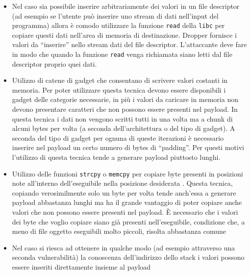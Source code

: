 \begin{itemize}

\item Nel caso sia possibile inserire arbitrariamente dei valori in un
  file descriptor (ad esempio se l'utente può inserire uno stream di
  dati nell'input del programma) allora è comodo utilizzare la
  funzione \lstinline{read} della \lstinline{libc} per copiare questi
  dati nell'area di memoria di destinazione. Dropper fornisce i valori
  da ``inserire'' nello stream dati del file descriptor. L'attaccante
  deve fare in modo che quando la funzione \lstinline{read} venga
  richiamata siano letti dal file descriptor proprio quei dati.

\item Utilizzo di catene di gadget che consentano di scrivere valori
  costanti in memoria. Per poter utilizzare questa tecnica devono
  essere disponibili i gadget delle categorie necessarie, in più i
  valori da caricare in memoria non devono presentare caratteri che
  non possono essere presenti nel payload. In questa tecnica i dati
  non vengono scritti tutti in una volta ma a chunk di alcuni bytes
  per volta (a seconda dell'architettura o del tipo di gadget). A
  seconda del tipo di gadget per ognuna di queste iterazioni è
  necessario inserire nel payload un certo numero di bytes di
  ``padding''. Per questi motivi l'utilizzo di questa tecnica tende a
  generare payload piuttosto lunghi.

\item Utilizzo delle funzioni \lstinline{strcpy} o \lstinline{memcpy}
  per copiare byte presenti in posizioni note all'interno
  dell'eseguibile nella posizione desiderata \cite{longld:2010}.
  Questa tecnica, copiando verosimilmente solo un byte per volta tende
  anch'essa a generare payload abbastanza lunghi ma ha il grande
  vantaggio di poter copiare anche valori che non possono essere
  presenti nel payload. È necessario che i valori dei byte che voglio
  copiare siano già presenti nell'eseguibile, condizione che, a meno
  di file oggetto eseguibili molto piccoli, risolta abbastanza comune

\item Nel caso si riesca ad ottenere in qualche modo (ad esempio
  attraverso una seconda vulnerabilità) la conoscenza dell'indirizzo
  dello stack i valori possono essere inseriti direttamente insieme al
  payload

\end{itemize}

